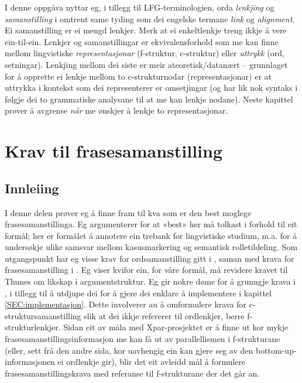 \documentclass[12pt,a4paper,oneside,draft]{report}
\begin{document}
 I denne oppgåva nyttar eg, i tillegg til LFG-terminologien, orda
 \emph{lenkjing} og \emph{samanstilling} i omtrent same tyding som dei engelske
 termane \emph{link} og \emph{alignment}. Ei samanstilling er ei mengd
 lenkjer. Merk at ei enkeltlenkje treng ikkje å vere ein-til-ein.
 Lenkjer og samanstillingar er ekvivalensforhold som me kan finne
 mellom lingvistiske \emph{representasjonar} (f-struktur, c-struktur) eller
 \emph{uttrykk} (ord, setningar). Lenkjing mellom dei siste er meir
 ateoretisk/datanært -- grunnlaget for å opprette ei lenkje mellom to
 c-strukturnodar (representasjonar) er at uttrykka i kontekst som dei
 representerer er omsetjingar (og har lik nok syntaks i følgje dei to
 grammatiske analysane til at me kan lenkje nodane). Neste kapittel
 prøver å avgrense \emph{når} me ønskjer å lenkje to representasjonar.


\chapter{Krav til frasesamanstilling}
\label{sec-3}

\label{SEC:ideell}

\section{Innleiing}
\label{sec-3.1}

I denne delen prøver eg å finne fram til kva som er den best moglege
 frasesamanstillinga. Eg argumenterer for at «best» her må tolkast i
 forhold til eit formål; her er formålet å annotere ein trebank for
 lingvistiske studium, m.a. for å undersøkje ulike samsvar mellom
 kasusmarkering og semantisk rolletildeling.  Som utgangspunkt har eg
 visse krav for ordsamanstilling gitt i \citet{thunes2003eal}, saman
 med krava for frasesamanstilling i \citet{dyvik2009lmp}. Eg viser
 kvifor ein, for våre formål, må revidere kravet til Thunes om likskap
 i argumentstruktur. Eg gir nokre døme for å grunngje krava i
 \citet{dyvik2009lmp}, i tillegg til å utdjupe dei for å gjere dei
 enklare å implementere i kapittel \ref{SEC:implementasjon}. Dette
 involverer au å omformulere krava for c-struktursamanstilling slik at
 dei ikkje refererer til ordlenkjer, berre f-strukturlenkjer. Sidan
 eit av måla med Xpar-prosjektet er å finne ut kor mykje
 frasesamanstillingsinformasjon me kan få ut av parallellismen i
 f-strukturane (eller, sett frå den andre sida, kor uavhengig ein kan
 gjere seg av den bottom-up-informasjonen ei ordlenkje gir), blir det
 eit avleidd mål å formulere frasesamanstillingskrava med referanse
 til f-strukturane der det går an.
\end{document}

